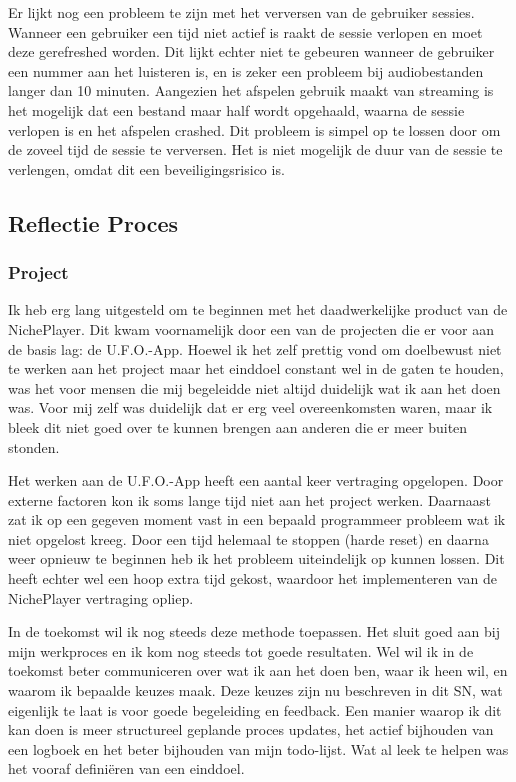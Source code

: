 Er lijkt nog een probleem te zijn met het verversen van de gebruiker sessies. Wanneer een gebruiker een tijd niet actief is raakt de sessie verlopen en moet deze gerefreshed worden. Dit lijkt echter niet te gebeuren wanneer de gebruiker een nummer aan het luisteren is, en is zeker een probleem bij audiobestanden langer dan 10 minuten. Aangezien het afspelen gebruik maakt van streaming is het mogelijk dat een bestand maar half wordt opgehaald, waarna de sessie verlopen is en het afspelen crashed. Dit probleem is simpel op te lossen door om de zoveel tijd de sessie te verversen. Het is niet mogelijk de duur van de sessie te verlengen, omdat dit een beveiligingsrisico is.

\subsection{Reflectie Proces}

\subsubsection*{Project}
Ik heb erg lang uitgesteld om te beginnen met het daadwerkelijke product van de NichePlayer. Dit kwam voornamelijk door een van de projecten die er voor aan de basis lag: de U.F.O.-App. Hoewel ik het zelf prettig vond om doelbewust niet te werken aan het project maar het einddoel constant wel in de gaten te houden, was het voor mensen die mij begeleidde niet altijd duidelijk wat ik aan het doen was. Voor mij zelf was duidelijk dat er erg veel overeenkomsten waren, maar ik bleek dit niet goed over te kunnen brengen aan anderen die er meer buiten stonden.

Het werken aan de U.F.O.-App heeft een aantal keer vertraging opgelopen. Door externe factoren kon ik soms lange tijd niet aan het project werken. Daarnaast zat ik op een gegeven moment vast in een bepaald programmeer probleem wat ik niet opgelost kreeg. Door een tijd helemaal te stoppen (harde reset) en daarna weer opnieuw te beginnen heb ik het probleem uiteindelijk op kunnen lossen. Dit heeft echter wel een hoop extra tijd gekost, waardoor het implementeren van de NichePlayer vertraging opliep.

In de toekomst wil ik nog steeds deze methode toepassen. Het sluit goed aan bij mijn werkproces en ik kom nog steeds tot goede resultaten. Wel wil ik in de toekomst beter communiceren over wat ik aan het doen ben, waar ik heen wil, en waarom ik bepaalde keuzes maak. Deze keuzes zijn nu beschreven in dit SN, wat eigenlijk te laat is voor goede begeleiding en feedback. Een manier waarop ik dit kan doen is meer structureel geplande proces updates, het actief bijhouden van een logboek en het beter bijhouden van mijn todo-lijst. Wat al leek te helpen was het vooraf definiëren van een einddoel.

